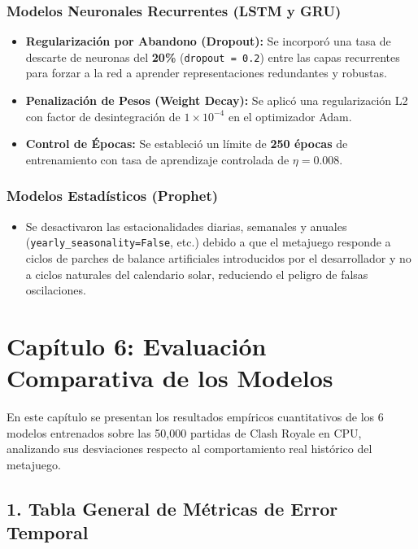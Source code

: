 \documentclass[
  spanish,
  12pt,
]{report}
\providecommand{\tightlist}{%
  \setlength{\itemsep}{0pt}\setlength{\parskip}{0pt}}
\begin{document}
\subsection{Modelos Neuronales Recurrentes (LSTM y
GRU)}\label{modelos-neuronales-recurrentes-lstm-y-gru}

\begin{itemize}
\tightlist
\item
  \textbf{Regularización por Abandono (Dropout):} Se incorporó una tasa
  de descarte de neuronas del \textbf{20\%} (\texttt{dropout\ =\ 0.2})
  entre las capas recurrentes para forzar a la red a aprender
  representaciones redundantes y robustas.
\item
  \textbf{Penalización de Pesos (Weight Decay):} Se aplicó una
  regularización L2 con factor de desintegración de \(1 \times 10^{-4}\)
  en el optimizador Adam.
\item
  \textbf{Control de Épocas:} Se estableció un límite de \textbf{250
  épocas} de entrenamiento con tasa de aprendizaje controlada de
  \(\eta = 0.008\).
\end{itemize}

\subsection{Modelos Estadísticos
(Prophet)}\label{modelos-estaduxedsticos-prophet}

\begin{itemize}
\tightlist
\item
  Se desactivaron las estacionalidades diarias, semanales y anuales
  (\texttt{yearly\_seasonality=False}, etc.) debido a que el metajuego
  responde a ciclos de parches de balance artificiales introducidos por
  el desarrollador y no a ciclos naturales del calendario solar,
  reduciendo el peligro de falsas oscilaciones.
\end{itemize}

\chapter{Capítulo 6: Evaluación Comparativa de los
Modelos}\label{capuxedtulo-6-evaluaciuxf3n-comparativa-de-los-modelos}

En este capítulo se presentan los resultados empíricos cuantitativos de
los 6 modelos entrenados sobre las 50,000 partidas de Clash Royale en
CPU, analizando sus desviaciones respecto al comportamiento real
histórico del metajuego.

\section{1. Tabla General de Métricas de Error
Temporal}\label{tabla-general-de-muxe9tricas-de-error-temporal}
\end{document}
